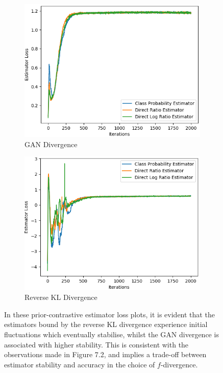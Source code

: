 \documentclass[honours,12pt]{unswthesis}
\numberwithin{equation}{section}
\theoremstyle{definition}
\begin{document}
\newpage
\begin{figure}[h]
\begin{subfigure}{0.49\textwidth}
\includegraphics[width=\linewidth]{part2estimatorlosses/PCADVvsPCADVexpvsPCADVgudlog.png}
\caption{GAN Divergence}
\end{subfigure}
\begin{subfigure}{0.49\textwidth}
\includegraphics[width=\linewidth]{part2estimatorlosses/PCKLDvsPCKLexpvsPCKLgudlog.png}
\caption{Reverse KL Divergence}
\end{subfigure}
\caption{\small In these prior-contrastive estimator loss plots, it is evident that the estimators bound by the reverse KL divergence experience initial fluctuations which eventually stabilise, whilst the GAN divergence is associated with higher stability. This is consistent with the observations made in Figure 7.2, and implies a trade-off between estimator stability and accuracy in the choice of $f$-divergence.}
\end{figure}
\end{document}
